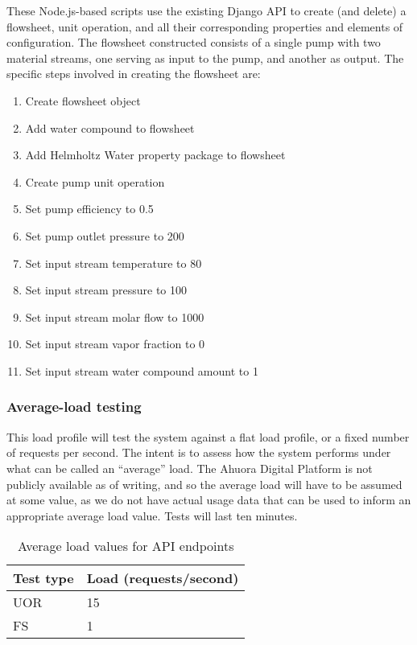 These Node.js-based scripts use the existing Django API to create (and delete) a flowsheet, unit operation, and all their corresponding properties and elements of configuration. The flowsheet constructed consists of a single pump with two material streams, one serving as input to the pump, and another as output. The specific steps involved in creating the flowsheet are:

\begin{enumerate}[itemsep=0pt]
    \item Create flowsheet object
    \item Add water compound to flowsheet
    \item Add Helmholtz Water property package to flowsheet
    \item Create pump unit operation
    \item Set pump efficiency to 0.5
    \item Set pump outlet pressure to 200
    \item Set input stream temperature to 80
    \item Set input stream pressure to 100
    \item Set input stream molar flow to 1000
    \item Set input stream vapor fraction to 0
    \item Set input stream water compound amount to 1
\end{enumerate}

\subsubsection{Average-load testing}

This load profile will test the system against a flat load profile, or a fixed number of requests per second. The intent is to assess how the system performs under what can be called an ``average'' load. The Ahuora Digital Platform is not publicly available as of writing, and so the average load will have to be assumed at some value, as we do not have actual usage data that can be used to inform an appropriate average load value. Tests will last ten minutes.

\begin{table}[h]
    \centering
    \begin{tabularx}{\textwidth}{|X|X|}
        \hline
        \textbf{Test type} & \textbf{Load (requests/second)}  \\ \hline
        UOR & 15 \\ \hline
        FS & 1 \\ \hline
    \end{tabularx}
    \caption{Average load values for API endpoints}
    \label{table:test-average-load-plan}
\end{table}

